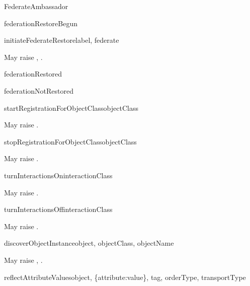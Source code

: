 \begin{classdesc}{FederateAmbassador}{}
\begin{methoddesc}{federationRestoreBegun}{}
\end{methoddesc}

\begin{methoddesc}{initiateFederateRestore}{label, federate}

May raise
,
.
\end{methoddesc}

\begin{methoddesc}{federationRestored}{}
\end{methoddesc}

\begin{methoddesc}{federationNotRestored}{}
\end{methoddesc}

\medskip
{}

\begin{methoddesc}{startRegistrationForObjectClass}{objectClass}

May raise
.
\end{methoddesc}

\begin{methoddesc}{stopRegistrationForObjectClass}{objectClass}

May raise
.
\end{methoddesc}

\begin{methoddesc}{turnInteractionsOn}{interactionClass}

May raise
.
\end{methoddesc}

\begin{methoddesc}{turnInteractionsOff}{interactionClass}

May raise
.
\end{methoddesc}

\medskip
{}

\begin{methoddesc}{discoverObjectInstance}{object, objectClass, objectName}

May raise
,
.
\end{methoddesc}

\begin{methoddesc}{reflectAttributeValues}{object, \{attribute:value\}, tag, orderType, transportType}


\end{methoddesc}
\end{classdesc}
